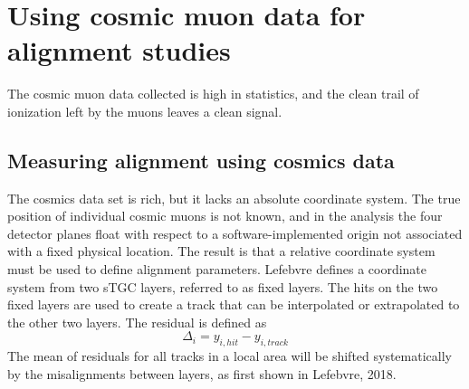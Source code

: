 
\chapter{Using cosmic muon data for alignment studies}

The cosmic muon data collected is high in statistics, and the clean trail of ionization left by the muons leaves a clean signal.

\section{Measuring alignment using cosmics data}
The cosmics data set is rich, but it lacks an absolute coordinate system. The true position of individual cosmic muons is not known, and in the analysis the four detector planes float with respect to a software-implemented origin  not associated with a fixed physical location. The result is that a relative coordinate system must be used to define alignment parameters. Lefebvre defines a coordinate system from two sTGC layers, referred to as fixed layers\cite{lefebvre_thesis}. The hits on the two fixed layers are used to create a track that can be interpolated or extrapolated to the other two layers. The residual is defined as 
\begin{equation}
    \Delta_i = y_{i,hit} - y_{i,track}
\end{equation}
The mean of residuals for all tracks in a local area will be shifted systematically by the misalignments between layers, as first shown in Lefebvre, 2018\cite{lefebvre_thesis}. 

